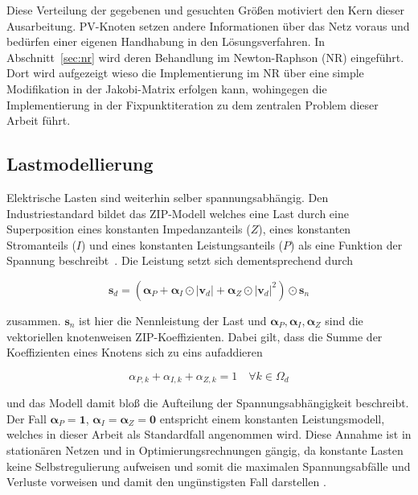 Diese Verteilung der gegebenen und gesuchten Größen motiviert den Kern dieser Ausarbeitung. 
PV-Knoten setzen andere Informationen über das Netz voraus und bedürfen einer eigenen Handhabung in den Lösungsverfahren. 
In Abschnitt~\ref{sec:nr} wird deren Behandlung im Newton-Raphson (NR) eingeführt.
Dort wird aufgezeigt wieso die Implementierung im NR über eine simple Modifikation in der Jakobi-Matrix erfolgen kann, wohingegen die Implementierung in der Fixpunktiteration zu dem zentralen Problem dieser Arbeit führt. 

\subsection{Lastmodellierung}
\label{subsec:lastmodell}

Elektrische Lasten sind weiterhin selber spannungsabhängig. 
Den Industriestandard bildet das ZIP-Modell welches eine Last durch eine Superposition eines konstanten Impedanzanteils ($Z$), eines konstanten Stromanteils ($I$) und eines konstanten Leistungsanteils ($P$) als eine Funktion der Spannung beschreibt~\cite{Giraldo2022}.  
Die Leistung setzt sich dementsprechend durch

\begin{equation}
	\label{eq:zip}
	\mathbf{s}_d = \left(\boldsymbol{\alpha}_P + \boldsymbol{\alpha}_I \odot |\mathbf{v}_d| + \boldsymbol{\alpha}_Z \odot |\mathbf{v}_d|^2\right) \odot \mathbf{s}_n
\end{equation}

zusammen. $\mathbf{s}_n$ ist hier die Nennleistung der Last und $\boldsymbol{\alpha}_P, \boldsymbol{\alpha}_I, \boldsymbol{\alpha}_Z$ sind die vektoriellen knotenweisen ZIP-Koeffizienten. 
Dabei gilt, dass die Summe der Koeffizienten eines Knotens sich zu eins aufaddieren 

\begin{equation}
	\alpha_{P,k} + \alpha_{I,k} + \alpha_{Z,k} = 1 \quad \forall k \in \Omega_d
\end{equation}

und das Modell damit bloß die Aufteilung der Spannungsabhängigkeit beschreibt.
Der Fall $\boldsymbol{\alpha}_P = \mathbf{1}$, $\boldsymbol{\alpha}_I = \boldsymbol{\alpha}_Z = \mathbf{0}$ entspricht einem konstanten Leistungsmodell, welches in dieser Arbeit als Standardfall angenommen wird.
Diese Annahme ist in stationären Netzen und in Optimierungsrechnungen gängig, da konstante Lasten keine Selbstregulierung aufweisen und somit die maximalen Spannungsabfälle und Verluste vorweisen und damit den ungünstigsten Fall darstellen \cite{Kundur1994,Kersting2017,IEEETF1995,VanCutsem1998,Bolognani2016}. 



